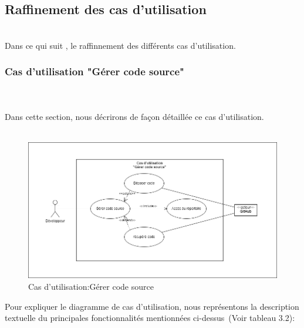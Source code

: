 \subsection{\LARGE  Raffinement des cas d’utilisation}
\texttt{}\\[0.1cm]
\textsf{\selectfont{}
Dans ce qui suit , le raffinnement des différents cas d'utilisation.}\\[0.2cm]
\subsubsection{\Large Cas d’utilisation "Gérer code source"}
\textsf{\selectfont{} \\\texttt{}\\[0.01cm]
Dans cette section, nous décrirons de façon détaillée ce cas d'utilisation.\\\texttt{}\\[0.01cm]
}
\begin{figure}[H]
  \begin{center}
  
      \includegraphics[width=15cm]{usecase1.drawio.png}

  \end{center}
  
  \caption{Cas d'utilisation:Gérer code source }
\end{figure}
\textsf{\selectfont{}
Pour expliquer  le diagramme de cas d’utilisation, nous représentons la description textuelle du principales fonctionnalités mentionnées ci-dessus (Voir tableau 3.2): \\}

